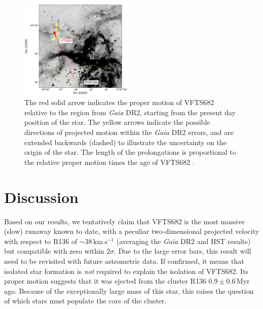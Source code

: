 \documentclass[apjl,twocolumn]{emulateapj}
\newcommand{\todo}[1]{{\large $\blacksquare$~\textbf{\color{red}[#1]}}~$\blacksquare$}
\newcommand{\SdM}[1]{{{\color{brown}{#1}}}}
\newcommand{\kms}{{\,\mathrm{km\ s^{-1}}}}
\begin{document}
\begin{figure}%
  \centering
  \includegraphics[width=0.48\textwidth]{./figures/main_plot_good_gaia_only}  
  \caption{\SdM{I don't see a reason why we would not show the HST data, except for wanting to hide it maybe.  Let's sit together and find a good way to plot both.  (Hope you still have the script to show the HST direction. )}  The red solid arrow indicates the proper motion of VFTS682 
    relative to the region from \emph{Gaia} DR2, starting from the present day position of
    the star. The yellow arrows indicate the possible
    directions of projected motion within the \emph{Gaia} DR2 errors, and are extended
    backwards (dashed) to illustrate the uncertainty on the origin of the
    star. The length of the prolongations is proportional to the relative proper motion
    times the age of VFTS682 \citep[$1.0\pm0.2$\,Myr,][]{schneider:18}.
  }
  
  \label{fig:main}
\end{figure}


\section{Discussion}
\label{sec:discussion}

Based on our results, we tentatively claim that VFTS682 is the most massive
(slow) runaway known to date, with a peculiar two-dimensional
projected velocity with respect to R136 of
$\sim38\kms$ (averaging the \emph{Gaia} DR2 and HST
results) but compatible with zero within $2\sigma$. Due to the large error bars, this result will need
to be revisited with future astrometric data. %
If confirmed, it means that isolated star formation is
\emph{not} required to explain the isolation of VFTS682. Its proper motion suggests that it was ejected from the cluster R136
$0.9\pm0.6$\,Myr ago. Because of the exceptionally large mass
of this star, this raises the question of which stars must populate
the core of the cluster.
\end{document}
